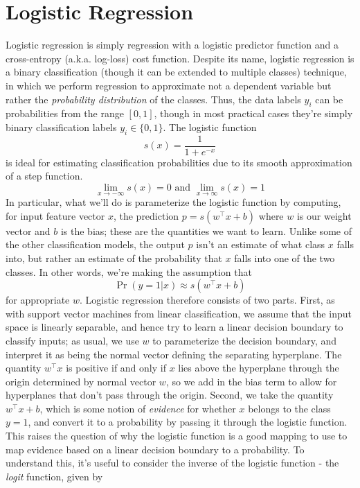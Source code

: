 \documentclass{article}
\begin{document}
\section{Logistic Regression}
Logistic regression is simply regression with a logistic predictor function and a cross-entropy (a.k.a. log-loss) cost function. Despite its name, logistic regression is a binary classification (though it can be extended to multiple classes) technique, in which we perform regression to approximate not a dependent variable but rather the \textit{probability distribution} of the classes. Thus, the data labels $ y_i $ can be probabilities from the range $ [0, 1] $, though in most practical cases they're simply binary classification labels $ y_i \in \{ 0, 1 \} $.
\newline
The logistic function 
$$ s(x) = \frac{1}{1 + e^{-x}} $$
is ideal for estimating classification probabilities due to its smooth approximation of a step function. 
$$ \lim_{x \to - \infty} s(x) = 0 \text{ and } \lim_{x \to \infty} s(x) = 1 $$
In particular, what we'll do is parameterize the logistic function by computing, for input feature vector $ x $, the prediction $ p = s(w^\intercal x + b) $ where $ w $ is our weight vector and $ b $ is the bias; these are the quantities we want to learn. Unlike some of the other classification models, the output $ p $ isn't an estimate of what class $ x $ falls into, but rather an estimate of the probability that $ x $ falls into one of the two classes. In other words, we're making the assumption that
$$ \Pr(y = 1 | x) \approx s(w^\intercal x + b) $$
for appropriate $ w $. Logistic regression therefore consists of two parts. First, as with support vector machines from linear classification, we assume that the input space is linearly separable, and hence try to learn a linear decision boundary to classify inputs; as usual, we use $ w $ to parameterize the decision boundary, and interpret it as being the normal vector defining the separating hyperplane. The quantity $ w^\intercal x $ is positive if and only if $ x $ lies above the hyperplane through the origin determined by normal vector $ w $, so we add in the bias term to allow for hyperplanes that don't pass through the origin. Second, we take the quantity $ w^\intercal x + b $, which is some notion of \textit{evidence} for whether $ x $ belongs to the class $ y = 1 $, and convert it to a probability by passing it through the logistic function.
\newline
This raises the question of why the logistic function is a good mapping to use to map evidence based on a linear decision boundary to a probability. To understand this, it's useful to consider the inverse of the logistic function - the \textit{logit} function, given by
\end{document}
